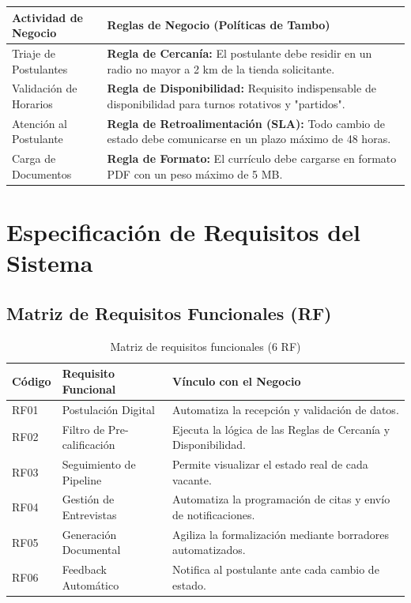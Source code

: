 \renewcommand{\arraystretch}{1.5} 
\begin{table}[H]
\centering
\begin{tabular}{|l|p{10cm}|}
\hline
\textbf{Actividad de Negocio} & \textbf{Reglas de Negocio (Políticas de Tambo)} \\ \hline
Triaje de Postulantes & \textbf{Regla de Cercanía:} El postulante debe residir en un radio no mayor a 2 km de la tienda solicitante. \\ \hline
Validación de Horarios & \textbf{Regla de Disponibilidad:} Requisito indispensable de disponibilidad para turnos rotativos y "partidos". \\ \hline
Atención al Postulante & \textbf{Regla de Retroalimentación (SLA):} Todo cambio de estado debe comunicarse en un plazo máximo de 48 horas. \\ \hline
Carga de Documentos & \textbf{Regla de Formato:} El currículo debe cargarse en formato PDF con un peso máximo de 5 MB. \\ \hline
\end{tabular}
\end{table}

\section{Especificación de Requisitos del Sistema}

\subsection{Matriz de Requisitos Funcionales (RF)}

\begin{table}[H]
\centering
\caption{Matriz de requisitos funcionales (6 RF)}
\label{tab:requisitos_funcionales}
\begin{tabular}{|l|l|p{7.5cm}|}
\hline
\textbf{Código} & \textbf{Requisito Funcional} & \textbf{Vínculo con el Negocio} \\ \hline
RF01 & Postulación Digital & Automatiza la recepción y validación de datos. \\ \hline
RF02 & Filtro de Pre-calificación & Ejecuta la lógica de las Reglas de Cercanía y Disponibilidad. \\ \hline
RF03 & Seguimiento de Pipeline & Permite visualizar el estado real de cada vacante. \\ \hline
RF04 & Gestión de Entrevistas & Automatiza la programación de citas y envío de notificaciones. \\ \hline
RF05 & Generación Documental & Agiliza la formalización mediante borradores automatizados. \\ \hline
RF06 & Feedback Automático & Notifica al postulante ante cada cambio de estado. \\ \hline
\end{tabular}
\end{table}

